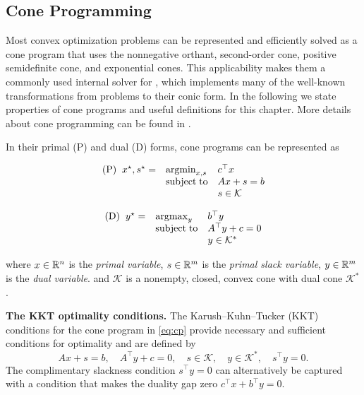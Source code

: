 \subsection{Cone Programming}
Most convex optimization problems can be represented and
efficiently solved as a cone program that uses
the nonnegative orthant, second-order cone,
positive semidefinite cone, and exponential cones.
This applicability makes them a commonly used internal
solver for \cvxpy, which implements many of the
well-known transformations from problems to their
conic form.
In the following we state properties of cone programs
and useful definitions for this chapter.
More details about cone programming can be found in
\citet{boyd2004convex,ben2001lectures,busseti2018solution,odonoghue2016conic,lobo1998applications,alizadeh2003second}.

In their primal (P) and dual (D) forms,
cone programs can be represented as \\
\begin{minipage}{0.45\textwidth}
  \begin{equation*}
    \begin{array}{lll}
      \text{(P)}\;\; {x^\star}, {s^\star} =
      &\operatorname*{argmin}_{x,s} &c^\top x\\
      &\operatorname*{subject\;to} &  Ax+s=b\\
      &  &s\in  \mathcal{K}
    \end{array}
  \end{equation*}
  \vspace{3mm}
\end{minipage}
\hfill
\begin{minipage}{0.5\textwidth}
  \begin{equation}
    \label{eq:cp}
    \begin{array}{lll}
      \text{(D)}\;\; {y^\star} =
      & \operatorname*{argmax}_y & b^\top y\\
      &\operatorname*{subject\;to} & A^\top y+c=0\\
      &&y\in  \mathcal{K}^*
    \end{array}
  \end{equation}
  \vspace{3mm}
\end{minipage}
where $x\in\mathbb{R}^n$ is the \emph{primal variable},
$s\in\mathbb{R}^m$ is the \emph{primal slack variable},
$y\in\mathbb{R}^m$ is the \emph{dual variable}.
and $\mathcal{K}$ is a nonempty, closed, convex cone
with dual cone $\mathcal{K}^*$.

\textbf{The KKT optimality conditions.}
The Karush--Kuhn--Tucker (KKT) conditions for the
cone program in \cref{eq:cp} provide
necessary and sufficient conditions for optimality
and are defined by
\begin{equation}
\label{eq:cp-kkt}
Ax +s =b, \quad
A^\top y + c = 0, \quad
s \in \mathcal{K}, \quad
y \in \mathcal{K}^*, \quad
s^\top y = 0.
\end{equation}
The complimentary slackness condition $s^\top y = 0$ can
alternatively be captured with a condition that
makes the duality gap zero $c^\top x + b^\top y = 0$.


